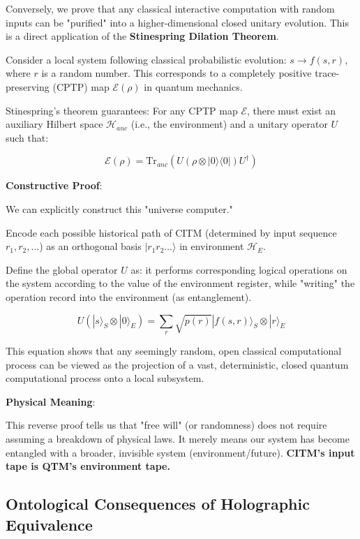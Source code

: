 Conversely, we prove that any classical interactive computation with random inputs can be "purified" into a higher-dimensional closed unitary evolution. This is a direct application of the \textbf{Stinespring Dilation Theorem}.

Consider a local system following classical probabilistic evolution: $s \to f(s, r)$, where $r$ is a random number. This corresponds to a completely positive trace-preserving (CPTP) map $\mathcal{E}(\rho)$ in quantum mechanics.

Stinespring's theorem guarantees: For any CPTP map $\mathcal{E}$, there must exist an auxiliary Hilbert space $\mathcal{H}_{anc}$ (i.e., the environment) and a unitary operator $U$ such that:

\begin{equation}
\mathcal{E}(\rho) = \text{Tr}_{anc} (U (\rho \otimes |0\rangle\langle 0|) U^\dagger)
\end{equation}

\textbf{Constructive Proof}:

We can explicitly construct this "universe computer."

Encode each possible historical path of CITM (determined by input sequence $r_1, r_2, \dots$) as an orthogonal basis $|r_1 r_2 \dots\rangle$ in environment $\mathcal{H}_E$.

Define the global operator $U$ as: it performs corresponding logical operations on the system according to the value of the environment register, while "writing" the operation record into the environment (as entanglement).

\begin{equation}
U (|s\rangle_S \otimes |0\rangle_E) = \sum_r \sqrt{p(r)} |f(s,r)\rangle_S \otimes |r\rangle_E
\end{equation}

This equation shows that any seemingly random, open classical computational process can be viewed as the projection of a vast, deterministic, closed quantum computational process onto a local subsystem.

\textbf{Physical Meaning}:

This reverse proof tells us that "free will" (or randomness) does not require assuming a breakdown of physical laws. It merely means our system has become entangled with a broader, invisible system (environment/future). \textbf{CITM's input tape is QTM's environment tape.}

\subsection{Ontological Consequences of Holographic Equivalence}

